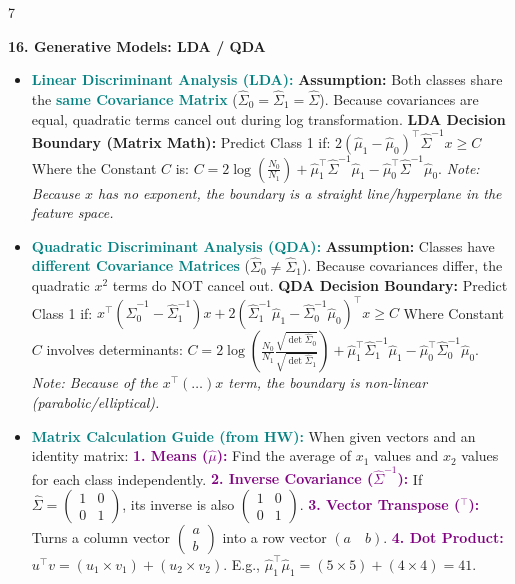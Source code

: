 \documentclass{article}
\newcommand{\hlhighlight}[1]{\par\vspace{1.5pt}\noindent\colorbox{yellow!50}{\parbox{\dimexpr\columnwidth-2\fboxsep\relax}{\textbf{#1}}}\par\vspace{0.5pt}}
\newcommand{\sectitle}[1]{\par\textbf{\color{blue!70!black}{#1}}\par}
\newcommand{\concept}[1]{\textcolor{teal}{\textbf{#1}}}
\newcommand{\procname}[1]{\textcolor{purple}{\textbf{#1}}}
\newcommand{\lbl}[1]{\textcolor{green!60!black}{\textbf{#1}}}
\begin{document}
\begin{multicols}{7}
\hlhighlight{16. Generative Models: LDA / QDA}
\sectitle{Discriminant Analysis}
\begin{itemize}
    \item \concept{Linear Discriminant Analysis (LDA):} \lbl{Assumption:} Both classes share the \concept{same Covariance Matrix} ($\hat{\Sigma}_0 = \hat{\Sigma}_1 = \hat{\Sigma}$). Because covariances are equal, quadratic terms cancel out during log transformation. \lbl{LDA Decision Boundary (Matrix Math):} Predict Class 1 if: $2(\hat{\mu}_1 - \hat{\mu}_0)^\top \hat{\Sigma}^{-1} x \geq C$ Where the Constant $C$ is: $C = 2 \log\left(\frac{N_0}{N_1}\right) + \hat{\mu}_1^\top \hat{\Sigma}^{-1} \hat{\mu}_1 - \hat{\mu}_0^\top \hat{\Sigma}^{-1} \hat{\mu}_0$. \textit{Note: Because $x$ has no exponent, the boundary is a straight line/hyperplane in the feature space.}
    \item \concept{Quadratic Discriminant Analysis (QDA):} \lbl{Assumption:} Classes have \concept{different Covariance Matrices} ($\hat{\Sigma}_0 \neq \hat{\Sigma}_1$). Because covariances differ, the quadratic $x^2$ terms do NOT cancel out. \lbl{QDA Decision Boundary:} Predict Class 1 if: $x^\top (\hat{\Sigma}_0^{-1} - \hat{\Sigma}_1^{-1}) x + 2(\hat{\Sigma}_1^{-1}\hat{\mu}_1 - \hat{\Sigma}_0^{-1}\hat{\mu}_0)^\top x \geq C$ Where Constant $C$ involves determinants: $C = 2\log\left(\frac{N_0}{N_1} \frac{\sqrt{\det \hat{\Sigma}_0}}{\sqrt{\det \hat{\Sigma}_1}}\right) + \hat{\mu}_1^\top \hat{\Sigma}_1^{-1} \hat{\mu}_1 - \hat{\mu}_0^\top \hat{\Sigma}_0^{-1} \hat{\mu}_0$. \textit{Note: Because of the $x^\top(\dots)x$ term, the boundary is non-linear (parabolic/elliptical).}
    \item \concept{Matrix Calculation Guide (from HW):} When given vectors and an identity matrix: \procname{1. Means ($\hat{\mu}$):} Find the average of $x_1$ values and $x_2$ values for each class independently. \procname{2. Inverse Covariance ($\hat{\Sigma}^{-1}$):} If $\hat{\Sigma} = \begin{pmatrix} 1 & 0 \\ 0 & 1 \end{pmatrix}$, its inverse is also $\begin{pmatrix} 1 & 0 \\ 0 & 1 \end{pmatrix}$. \procname{3. Vector Transpose ($^\top$):} Turns a column vector $\begin{pmatrix} a \\ b \end{pmatrix}$ into a row vector $(a \quad b)$. \procname{4. Dot Product:} $u^\top v = (u_1 \times v_1) + (u_2 \times v_2)$. E.g., $\hat{\mu}_1^\top \hat{\mu}_1 = (5\times5) + (4\times4) = 41$.
\end{itemize}


\end{multicols}
\end{document}
